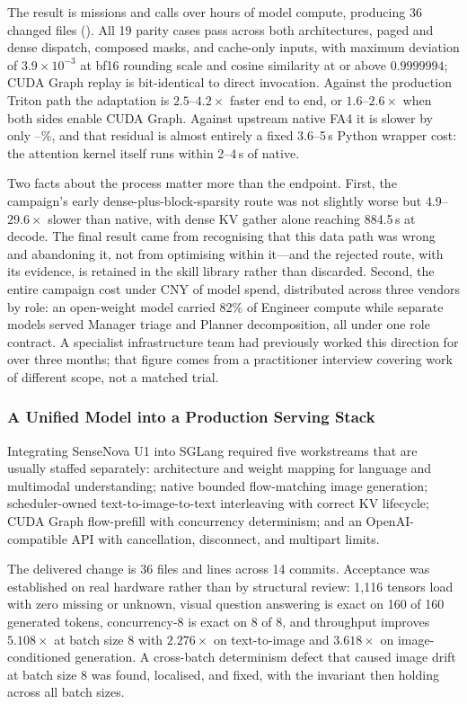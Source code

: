 The result is \FlashDAMissions{} missions and \FlashDACalls{} calls over
\FlashDACompute{} hours of model compute, producing 36 changed files
(). All 19 parity cases pass across both architectures, paged and
dense dispatch, composed masks, and cache-only inputs, with maximum deviation of
$3.9\times10^{-3}$ at bf16 rounding scale and cosine similarity at or above
$0.9999994$; CUDA Graph replay is bit-identical to direct invocation. Against the
production Triton path the adaptation is $2.5$--$4.2\times$ faster end to end, or
$1.6$--$2.6\times$ when both sides enable CUDA Graph. Against upstream native FA4 it
is slower by only \FlashDAGapLow--\FlashDAGapHigh\%, and that residual is almost
entirely a fixed 3.6--5\,\textmu s Python wrapper cost: the attention kernel itself
runs within 2--4\,\textmu s of native.

Two facts about the process matter more than the endpoint. First, the campaign's
early dense-plus-block-sparsity route was not slightly worse but $4.9$--$29.6\times$
slower than native, with dense KV gather alone reaching 884.5\,\textmu s at decode.
The final result came from recognising that this data path was wrong and abandoning
it, not from optimising within it---and the rejected route, with its evidence, is
retained in the skill library rather than discarded. Second, the entire campaign
cost under \FlashDACostCNY{} CNY of model spend, distributed across three vendors by
role: an open-weight model carried 82\% of Engineer compute while separate models
served Manager triage and Planner decomposition, all under one role contract. A
specialist infrastructure team had previously worked this direction for over three
months; that figure comes from a practitioner interview covering work of different
scope, not a matched trial.

\subsubsection{A Unified Model into a Production Serving Stack}

Integrating SenseNova U1 into SGLang required five workstreams that are usually
staffed separately: architecture and weight mapping for language and multimodal
understanding; native bounded flow-matching image generation; scheduler-owned
text-to-image-to-text interleaving with correct KV lifecycle; CUDA Graph
flow-prefill with concurrency determinism; and an OpenAI-compatible API with
cancellation, disconnect, and multipart limits.

The delivered change is 36 files and  lines across 14 commits.
Acceptance was established on real hardware rather than by structural review: 1,116
tensors load with zero missing or unknown, visual question answering is exact on
160 of 160 generated tokens, concurrency-8 is exact on 8 of 8, and throughput
improves $5.108\times$ at batch size 8 with $2.276\times$ on text-to-image and
$3.618\times$ on image-conditioned generation. A cross-batch determinism defect that
caused image drift at batch size 8 was found, localised, and fixed, with the
invariant then holding across all batch sizes.

